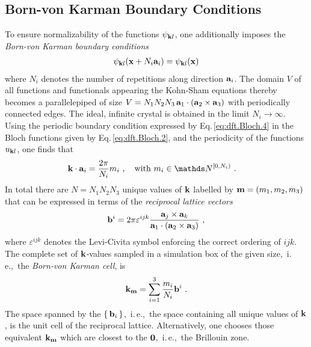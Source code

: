 \subsection{Born-von Karman Boundary Conditions}
To ensure normalizability of the functions $\psi_{{\bf k}l}$, one additionally imposes the \emph{Born-von Karman boundary conditions}
\begin{align}
	\psi_{{\bf k}l} ({\bf x} + N_i {\bf a}_i) 
		= \psi_{{\bf k}l} ({\bf x})
	\label{eq:dft.Bloch.4}
\end{align}
where $N_i$ denotes the number of repetitions along direction ${\bf a}_i$. The domain $V$ of all functions and functionals appearing the Kohn-Sham equations thereby becomes a parallelepiped of size 
$V = N_1 N_2 N_3 \, {\bf a}_1 \cdot ({\bf a}_2 \times {\bf a}_3)$ with periodically connected edges. The ideal, infinite crystal is obtained in the limit $N_i \rightarrow \infty$.
Using the periodic boundary condition expressed by Eq.\,\eqref{eq:dft.Bloch.4} in the Bloch functions given by Eq.\,\eqref{eq:dft.Bloch.2}, and the periodicity of the functions $u_{{\bf k} l}$, one finds that
\begin{align}
		{\bf k} \cdot {\bf a}_i
			&= \frac{2 \pi}{N_i} m_i~,\quad\text{with } m_i \in \mathds N^{[0, N_i)}~.
	\label{eq:dft.Bloch.5}
\end{align}
In total there are $N = N_1 N_2 N_3$ unique values of $\bf k$ labelled by ${\bf m} = (m_1, m_2, m_3)$ that can be expressed in terms of the \emph{reciprocal lattice vectors}~\cite{Sands2002}
\begin{align}
	{\bf b}^i 
		= 2 \pi \varepsilon^{ijk} \frac{{\bf a}_j \times {\bf a}_k}{{\bf a}_1 \cdot ({\bf a}_2 \times {\bf a}_3)} ~,
	\label{eq:dft.Bloch.bi}
\end{align}
where $\varepsilon^{ijk}$ denotes the Levi-Civita symbol enforcing the correct ordering of $ijk$. The complete set of $\bf k$-values sampled in a simulation box of the given size,~i.\,e.,~the \emph{Born-von Karman cell}, is
\begin{align}
	{\bf k}_{\bf m} 
		= \sum_{i=1}^3 \frac{m_i}{N_i} {\bf b}^i~.
	\label{eq:dft.Bloch.k_m}
\end{align}
The space spanned by the $\set{{\bf b}_i}$,~i.\,e.,~the space containing all unique values of ${\bf k}$, is the unit cell of the reciprocal lattice. Alternatively, one chooses those equivalent $\bf k_m$ which are closest to the $\bf 0$,~i.\,e.,~the Brillouin zone.

